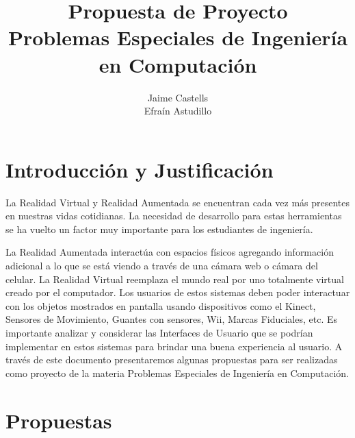 \documentclass[11pt]{article} %
\title{Propuesta de Proyecto\\Problemas Especiales de Ingeniería en Computación}
\author{Jaime Castells\\Efraín Astudillo}
\begin{document}
\maketitle


\section{Introducción y Justificación}

La Realidad Virtual y Realidad Aumentada se encuentran cada vez más presentes en nuestras vidas cotidianas. 
La necesidad de desarrollo para estas herramientas se ha vuelto un factor muy importante para los estudiantes de ingeniería. 

La Realidad Aumentada interactúa con espacios físicos agregando información adicional a lo que se está viendo a través de una cámara web o cámara
del celular. La Realidad Virtual reemplaza el mundo real por uno totalmente virtual creado por el computador\cite{rvadefinition}. 
Los usuarios de estos sistemas deben poder interactuar con los objetos mostrados en pantalla usando dispositivos como el Kinect, Sensores de Movimiento, 
Guantes con sensores, Wii, Marcas Fiduciales, etc. Es importante analizar y considerar las Interfaces de Usuario que se podrían implementar en estos 
sistemas para brindar una buena experiencia al usuario. A través de este documento presentaremos algunas propuestas para ser realizadas como proyecto de la materia 
Problemas Especiales de Ingeniería en Computación.

\section{Propuestas}
\end{document}
